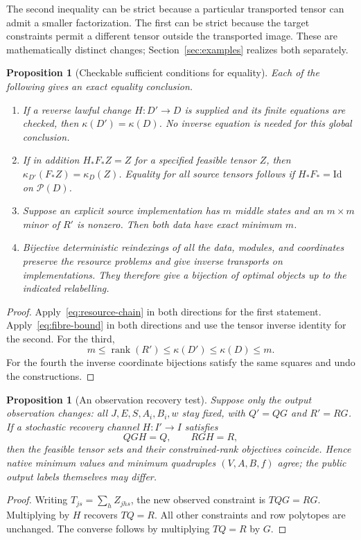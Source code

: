 \documentclass[11pt]{article}
\newcommand{\Id}{\mathrm{Id}}
\newcommand{\Pcal}{\mathcal P}
\newcommand{\rank}{\operatorname{rank}}
\newtheorem{proposition}[theorem]{Proposition}
\theoremstyle{remark}
\begin{document}
The second inequality can be strict because a particular transported tensor can admit a smaller factorization. The first can be strict because the target constraints permit a different tensor outside the transported image. These are mathematically distinct changes; Section~\ref{sec:examples} realizes both separately.

\begin{proposition}[Checkable sufficient conditions for equality]\label{prop:equality}
Each of the following gives an exact equality conclusion.
\begin{enumerate}
\item If a reverse lawful change $H:D'\to D$ is supplied and its finite equations are checked, then $\kappa(D')=\kappa(D)$. No inverse equation is needed for this global conclusion.
\item If in addition $H_*F_*Z=Z$ for a specified feasible tensor $Z$, then
$\kappa_{D'}(F_*Z)=\kappa_D(Z)$. Equality for all source tensors follows if $H_*F_*=\Id$ on $\Pcal(D)$.
\item Suppose an explicit source implementation has $m$ middle states and an $m\times m$ minor of $R'$ is nonzero. Then both data have exact minimum $m$.
\item Bijective deterministic reindexings of all the data, modules, and coordinates preserve the resource problems and give inverse transports on implementations. They therefore give a bijection of optimal objects up to the indicated relabelling.
\end{enumerate}
\end{proposition}
\begin{proof}
Apply~\eqref{eq:resource-chain} in both directions for the first statement. Apply~\eqref{eq:fibre-bound} in both directions and use the tensor inverse identity for the second. For the third,
\[
 m\le\rank(R')\le\kappa(D')\le\kappa(D)\le m.
\]
For the fourth the inverse coordinate bijections satisfy the same squares and undo the constructions.
\end{proof}

\begin{proposition}[An observation recovery test]\label{prop:recovery}
Suppose only the output observation changes: all $J,E,S,A_i,B_i,w$ stay fixed, with $Q'=QG$ and $R'=RG$. If a stochastic recovery channel $H:I'\to I$ satisfies
\[
 QGH=Q,\qquad RGH=R,
\]
then the feasible tensor sets and their constrained-rank objectives coincide. Hence native minimum values and minimum quadruples $(V,A,B,f)$ agree; the public output labels themselves may differ.
\end{proposition}
\begin{proof}
Writing $T_{js}=\sum_hZ_{jhs}$, the new observed constraint is $TQG=RG$. Multiplying by $H$ recovers $TQ=R$. All other constraints and row polytopes are unchanged. The converse follows by multiplying $TQ=R$ by $G$.
\end{proof}
\end{document}
